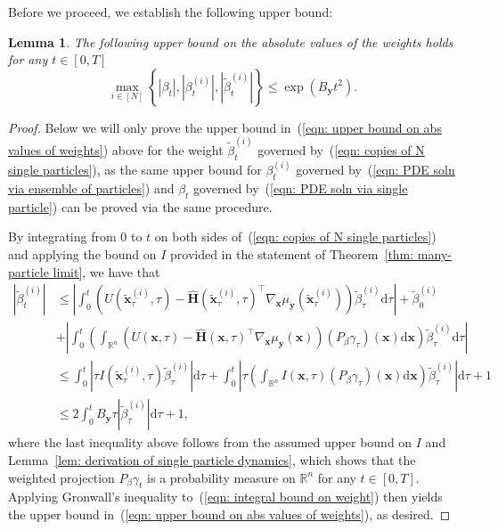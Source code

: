 \documentclass{article}
\numberwithin{equation}{section}
\newtheorem{lemma}[theorem]{Lemma}
\def\eqref#1{(\ref{#1})}
\newcommand{\dif}{{\mathrm{d}}}
\def\vx{{\bm{x}}}
\def\vy{{\bm{y}}}
\def\mH{{\bm{H}}}
\begin{document}
Before we proceed, we establish the following upper bound:
\begin{lemma}
    The following upper bound on the absolute values of the weights holds for any $t \in [0,T]$
    \begin{equation}
    \label{eqn: upper bound on abs values of weights}
    \max_{i \in [N]}\left\{\left|\beta_t\right|,\left|\beta^{(i)}_t\right|,\left|\widetilde{\beta}^{(i)}_t\right|\right\} \leq \exp\left(B_{\vy}t^2\right).
    \end{equation}
\end{lemma}
\begin{proof}
    Below we will only prove the upper bound in~\eqref{eqn: upper bound on abs values of weights} above for the weight $\widetilde{\beta}^{(i)}_t$ governed by~\eqref{eqn: copies of N single particles}, as the same upper bound for $\beta^{(i)}_t$ governed by~\eqref{eqn: PDE soln via ensemble of particles} and $\beta_t$ governed by~\eqref{eqn: PDE soln via single particle} can be proved via the same procedure. 
    
    By integrating from $0$ to $t$ on both sides of~\eqref{eqn: copies of N single particles} and applying the bound on $I$ provided in the statement of Theorem~\ref{thm: many-particle limit}, we have that
    \begin{equation}
    \label{eqn: integral bound on weight}
    \begin{aligned}
    \left|\widetilde{\beta}^{(i)}_t\right| &\leq \left|\int_{0}^{t}\left(U\left(\widetilde{\vx}^{(i)}_{\tau},\tau\right) - \widehat{\mH}\left(\widetilde{\vx}^{(i)}_{\tau},\tau\right)^\intercal\nabla_{\vx}\mu_{\vy}\left(\widetilde{\vx}^{(i)}_{\tau}\right)\right)\widetilde{\beta}^{(i)}_{\tau}\dif\tau\right| + \widetilde{\beta}^{(i)}_0\\
    &+\left|\int_{0}^{t}\left(\int_{\mathbb{R}^n}\left(U(\vx,\tau) - \widehat{\mH}(\vx,\tau)^\intercal\nabla_{\vx}\mu_{\vy}(\vx)\right)\left(P_{\beta}\gamma_\tau\right)(\vx)\dif \vx\right)\widetilde{\beta}^{(i)}_{\tau}\dif\tau\right|\\
    &\leq \int_{0}^{t}\left|\tau I\left(\widetilde{\vx}^{(i)}_{\tau},\tau\right)\widetilde{\beta}^{(i)}_{\tau}\right|\dif\tau + \int_{0}^{t}\left|\tau\left(\int_{\mathbb{R}^n}I\left(\vx,\tau\right)\left(P_{\beta}\gamma_\tau\right)(\vx)\dif \vx\right)\widetilde{\beta}^{(i)}_{\tau}\right|\dif\tau + 1\\
    &\leq 2\int_{0}^{t}B_{\vy}\tau\left|\widetilde{\beta}^{(i)}_{\tau}\right|\dif\tau  + 1,
    \end{aligned}    
    \end{equation}
    where the last inequality above follows from the assumed upper bound on $I$ and Lemma~\ref{lem: derivation of single particle dynamics}, which shows that the weighted projection $P_{\beta}\gamma_{t}$ is a probability measure on $\mathbb{R}^n$ for any $t \in [0,T]$. Applying Gronwall's inequality to~\eqref{eqn: integral bound on weight} then yields the upper bound in~\eqref{eqn: upper bound on abs values of weights}, as desired.
\end{proof}
\end{document}
